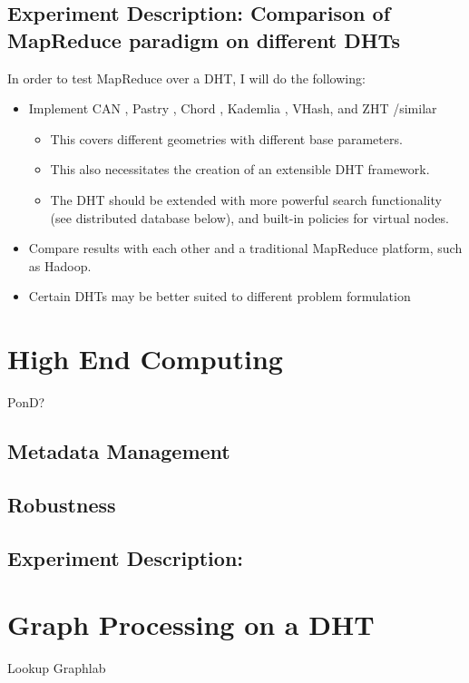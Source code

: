 \documentclass[10pt,letterpaper,twoside]{report}
\begin{document}
\subsection{Experiment Description: Comparison of MapReduce paradigm on different DHTs}
In order to test MapReduce over a DHT, I will do the following:
\begin{itemize}
	\item Implement CAN \cite{can}, Pastry \cite{pastry}, Chord \cite{chord}, Kademlia \cite{kademlia}, VHash, and ZHT \cite{li2013zht} /similar
	\begin{itemize}	
		\item This covers different geometries with different base parameters.
		\item This also necessitates the creation of an extensible DHT framework.
		\item  The DHT should be extended with more powerful search functionality (see distributed database below), and built-in policies for virtual nodes.
		
	\end{itemize}
	\item Compare results with each other and a traditional MapReduce platform, such as Hadoop.
	\item Certain DHTs may be better suited to different problem formulation
	
\end{itemize}



\section{High End Computing}
PonD?
\subsection{Metadata Management}
\subsection{Robustness}

\subsection{Experiment Description:}

\section{Graph Processing on a DHT}
Lookup Graphlab
\end{document}
